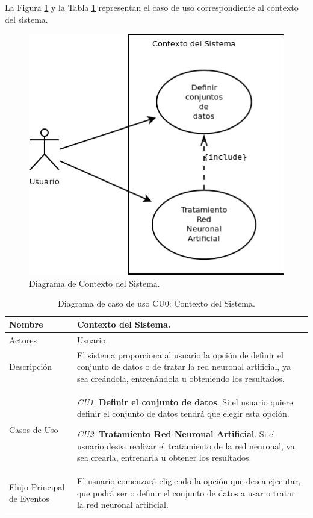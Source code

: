 			La Figura \ref{fig:DiagramaContexto} y la Tabla \ref{tab:CU0} representan el caso de uso correspondiente al contexto del sistema.\\
			
			\begin{figure}[!h]
				\centering
				\includegraphics[scale=0.6]{uml/DiagramaContexto.png}
				\caption{Diagrama de Contexto del Sistema.}
				\label{fig:DiagramaContexto}
			\end{figure}
			
			\begin{table}[!h]
				\centering
				\begin{tabular}{l|p{.5\linewidth}}
					\hline Nombre & Contexto del Sistema. \\ 
					\hline Actores & Usuario. \\ 
					\hline Descripción & El sistema proporciona al usuario la opción de definir el conjunto de datos o de tratar la red neuronal artificial, ya sea creándola, entrenándola u obteniendo los resultados. \\ 
					\hline Casos de Uso & \textit{CU1}. \textbf{Definir el conjunto de datos}. Si el usuario quiere definir el conjunto de datos tendrá que elegir esta opción.
					
					\textit{CU2}. \textbf{Tratamiento Red Neuronal Artificial}. Si el usuario desea realizar el tratamiento de la red neuronal, ya sea crearla, entrenarla u obtener los resultados. \\ 
					\hline Flujo Principal de Eventos & El usuario comenzará eligiendo la opción que desea ejecutar, que podrá ser o definir el conjunto de datos a usar o tratar la red neuronal artificial. \\ 
					\hline 
				\end{tabular}
				\caption{Diagrama de caso de uso CU0: Contexto del Sistema.}
				\label{tab:CU0}
			\end{table}
			
